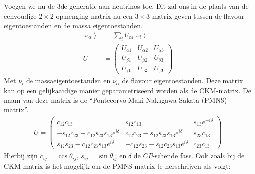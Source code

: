 \documentclass[../main.tex]{subfiles}
\begin{document}
Voegen we nu de 3de generatie aan neutrinos toe. Dit zal ons in de plaats van de eenvoudige $2\times 2$ opmenging matrix nu een $3\times 3$ matrix geven tussen de flavour eigentoestanden en de massa eigentoestanden.
\begin{equation}
    \begin{aligned}
        \label{eq:neutrino_3_oscilaties_1}
\left|\nu_{\alpha}\right> &=\sum_{i} U_{\alpha i}\left|\nu_{i}\right> \\
        U &=\left(\begin{array}{lll}
                U_{\alpha 1} & U_{\alpha 2} & U_{\alpha 3} \\
                U_{\beta 1} & U_{\beta 2} & U_{\beta 3} \\
                U_{\gamma 1} & U_{\gamma 2} & U_{\gamma 3}
        \end{array}\right)
    \end{aligned}
\end{equation}
Met $\nu_i$ de massaeigentoestanden en $\nu_\alpha$ de flavour eigentoestanden.
Deze matrix kan op een gelijkaardige manier geparametriseerd worden als de CKM-matrix. De naam van deze matrix is de ``Pontecorvo-Maki-Nakagawa-Sakata (PMNS) matrix''.
\begin{equation}
    \begin{aligned}
        \label{eq:pmns_matrix}
        U=\left(\begin{array}{ccc}
                c_{12} c_{13} & s_{12} c_{13} & s_{13} e^{-i \delta} \\
                -s_{12} c_{23}-c_{12} s_{23} s_{13} e^{i \delta} & c_{12} c_{23}-s_{12} s_{23} s_{13} e^{i \delta} & s_{23} c_{13} \\
                s_{12} s_{23}-c_{12} c_{23} s_{13} e^{i \delta} & -c_{12} s_{23}-s_{12} c_{23} s_{13} e^{i \delta} & c_{23} c_{13}
        \end{array}\right)
    \end{aligned}
\end{equation}
Hierbij zijn $c_{i j}=\cos \theta_{i j}$, $s_{i j}=\sin \theta_{i j}$ en $\delta$ de $CP$-schende fase. Ook zoals bij de CKM-matrix is het mogelijk om de PMNS-matrix te herschrijven als volgt:
\end{document}

